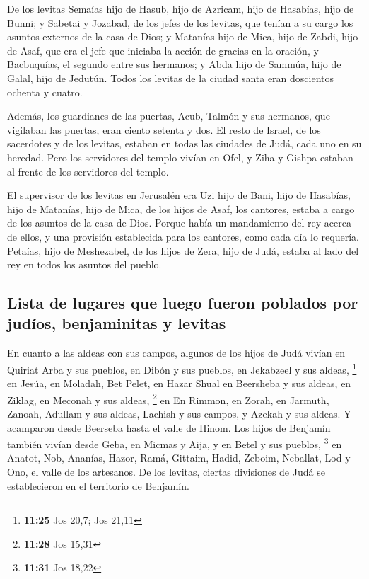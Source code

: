  De los levitas Semaías hijo de Hasub, hijo de Azricam,
hijo de Hasabías, hijo de Bunni;  y Sabetai y Jozabad, de
los jefes de los levitas, que tenían a su cargo los asuntos externos de
la casa de Dios;  y Matanías hijo de Mica, hijo de Zabdi,
hijo de Asaf, que era el jefe que iniciaba la acción de gracias en la
oración, y Bacbuquías, el segundo entre sus hermanos; y Abda hijo de
Sammúa, hijo de Galal, hijo de Jedutún.  Todos los
levitas de la ciudad santa eran doscientos ochenta y cuatro.

 Además, los guardianes de las puertas, Acub, Talmón y
sus hermanos, que vigilaban las puertas, eran ciento setenta y dos.
 El resto de Israel, de los sacerdotes y de los levitas,
estaban en todas las ciudades de Judá, cada uno en su heredad.
 Pero los servidores del templo vivían en Ofel, y Ziha y
Gishpa estaban al frente de los servidores del templo.

 El supervisor de los levitas en Jerusalén era Uzi hijo
de Bani, hijo de Hasabías, hijo de Matanías, hijo de Mica, de los hijos
de Asaf, los cantores, estaba a cargo de los asuntos de la casa de Dios.
 Porque había un mandamiento del rey acerca de ellos, y
una provisión establecida para los cantores, como cada día lo requería.
 Petaías, hijo de Meshezabel, de los hijos de Zera, hijo
de Judá, estaba al lado del rey en todos los asuntos del pueblo.

\hypertarget{lista-de-lugares-que-luego-fueron-poblados-por-juduxedos-benjaminitas-y-levitas}{%
\subsection{Lista de lugares que luego fueron poblados por judíos,
benjaminitas y
levitas}\label{lista-de-lugares-que-luego-fueron-poblados-por-juduxedos-benjaminitas-y-levitas}}

 En cuanto a las aldeas con sus campos, algunos de los
hijos de Judá vivían en Quiriat Arba y sus pueblos, en Dibón y sus
pueblos, en Jekabzeel y sus aldeas, \footnote{\textbf{11:25} Jos 20,7;
  Jos 21,11}  en Jesúa, en Moladah, Bet Pelet,
 en Hazar Shual en Beersheba y sus aldeas,
 en Ziklag, en Meconah y sus aldeas, \footnote{\textbf{11:28}
  Jos 15,31}  en En Rimmon, en Zorah, en Jarmuth,
 Zanoah, Adullam y sus aldeas, Lachish y sus campos, y
Azekah y sus aldeas. Y acamparon desde Beerseba hasta el valle de Hinom.
 Los hijos de Benjamín también vivían desde Geba, en
Micmas y Aija, y en Betel y sus pueblos, \footnote{\textbf{11:31} Jos
  18,22}  en Anatot, Nob, Ananías,  Hazor,
Ramá, Gittaim,  Hadid, Zeboim, Neballat, 
Lod y Ono, el valle de los artesanos.  De los levitas,
ciertas divisiones de Judá se establecieron en el territorio de
Benjamín.

